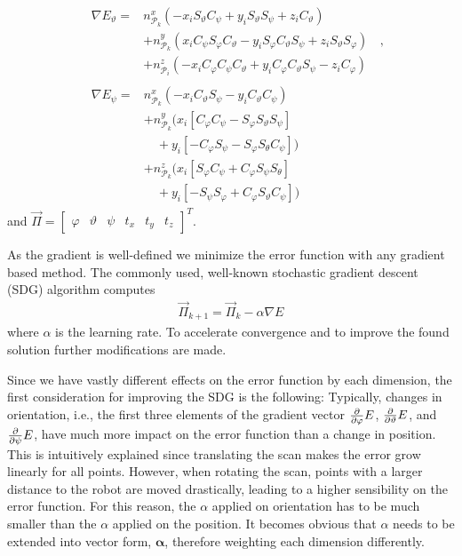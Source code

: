 \begin{align}
&\begin{aligned}
\nabla E_\vartheta = & n_{\mathcal{P}_k}^x(-x_iS_\vartheta C_\psi + y_i S_\vartheta S_\psi + z_iC_\vartheta) \\
        &+ n_{\mathcal{P}_k}^y(x_iC_\psi S_\varphi C_\vartheta - y_iS_\varphi C_\vartheta S_\psi + z_i S_\vartheta S_\varphi)  \\
        &+ n_{\mathcal{P}_i}^z(-x_iC_\varphi C_\psi C_\vartheta + y_iC_\varphi C_\vartheta S_\psi - z_i C_\varphi)
\end{aligned}\;\; ,\\
&\begin{aligned}
	\nabla E_\psi = &n_{\mathcal{P}_k}^x\left(-x_iC_\vartheta S_\psi - y_iC_\vartheta C_\psi\right) \\
       &+ n_{\mathcal{P}_k}^y(x_i[C_\varphi C_\psi - S_\varphi S_\vartheta S_\psi]\\
       &\quad+ y_i[-C_\varphi S_\psi - S_\varphi S_\theta C_\psi]) \\
       &+ n_{\mathcal{P}_k}^z(x_i[S_\varphi C_\psi + C_\varphi S_\psi S_\theta] \\
       &\quad+ y_i[-S_\psi S_ \varphi + C_\varphi S_\vartheta C_\psi]) 
\end{aligned}
\end{align}
and $\vec{\Pi}=\begin{bmatrix}\varphi & \vartheta & \psi & t_x & t_y & t_z\end{bmatrix}^T$.

As the gradient is well-defined we minimize the error function with any gradient based method. 
The commonly used, well-known stochastic gradient descent (SDG) algorithm computes 
\begin{align}
    \vec{\Pi}_{k+1} = \vec{\Pi}_{k} - \alpha \nabla E
\end{align}
where $\alpha$ is the learning rate.
To accelerate convergence and to improve the found solution further modifications are made.

Since we have vastly different effects on the error function by each dimension, the first consideration for improving the SDG is the following:
Typically, changes in orientation, i.e., the first three elements of the gradient vector $\frac{\partial}{\partial \varphi}E$, $\frac{\partial}{\partial \vartheta}E$, and $\frac{\partial}{\partial \psi}E$, have much more impact on the error function than a change in position.
This is intuitively explained since translating the scan makes the error grow linearly for all points.
However, when rotating the scan, points with a larger distance to the robot are moved drastically, leading to a higher sensibility on the error function.
For this reason, the $\alpha$ applied on orientation has to be much smaller than the $\alpha$ applied on the position.
It becomes obvious that $\alpha$ needs to be extended into vector form, $\boldsymbol\alpha$, therefore weighting each dimension differently.

